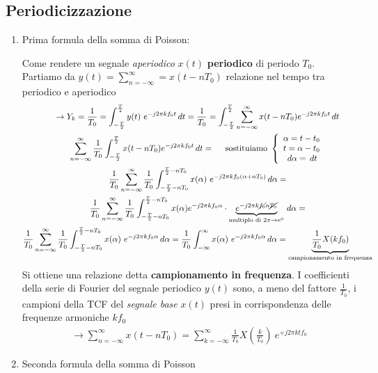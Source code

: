 \documentclass[
]{article}
\begin{document}
\subsection{Periodicizzazione}\label{periodicizzazione}

\begin{enumerate}
\def\labelenumi{\arabic{enumi}.}
\setcounter{enumi}{23}
\item
  Prima formula della somma di Poisson:

  Come rendere un segnale \emph{aperiodico} \(x(t)\) \textbf{periodico}
  di periodo \(T_0\). Partiamo da
  \(y(t)=\sum_{n=-\infty}^{\infty} = x(t-nT_0)\) relazione nel tempo tra
  periodico e aperiodico \begin{gather*}
  \to Y_k = \frac{1}{T_0} = \int_{-\frac{T}{2}}^{\frac{T}{2}} y(t) \ e^{-j2 \pi kf_{0}t} \,dt = \frac{1}{T_0} = \int_{-\frac{T}{2}}^{\frac{T}{2}} \sum_{n=-\infty}^{\infty} x(t-nT_0) e^{-j2\pi kf_{0}t} \,dt \\
  \sum_{n=-\infty}^{\infty}\frac{1}{T_0} \int_{-\frac{T}{2}}^{\frac{T}{2}} x(t-nT_0)e^{-j2\pi kf_{0}t} \,dt = \ \ \ \text{ sostituiamo } \left\{ \begin{array}{cl} \alpha = t-t_0 \\ t = \alpha -t_0 \\ \,d\alpha = \,dt \end{array}\right.  \\
  \frac{1}{T_0} \sum_{n=-\infty}^{\infty}\frac{1}{T_0} \int_{-\frac{T}{2}-nT_0}^{\frac{T}{2}-nT_0} x(\alpha) \ e^{-j2\pi kf_{0}(\alpha +nT_0)} \,d\alpha = \\
  \frac{1}{T_0} \sum_{n=-\infty}^{\infty}\frac{1}{T_0} \int_{-\frac{T}{2}-nT_0}^{\frac{T}{2}-nT_0} x(\alpha) e^{-j2\pi kf_{0}\alpha} \cdot \underbrace{e^{-j2\pi k\cancel{f_0}n\cancel{T_0}}}_{\text{multiplo di }2\pi \to e^{0}} \,d\alpha= \\
  \frac{1}{T_0} \sum_{n=-\infty}^{\infty}\frac{1}{T_0} \int_{-\frac{T}{2}-nT_0}^{\frac{T}{2}-nT_0} x(\alpha) \ e^{-j2\pi kf_{0}\alpha} \,d\alpha =
  \frac{1}{T_0} \int_{-\infty}^{\infty}x(\alpha) \ e^{-j2\pi kf_{0}\alpha}\,d\alpha = \underbrace{\frac{1}{T_0}X(kf_0)}_{\text{campionamento in frequenza}}
  \end{gather*} Si ottiene una relazione detta \textbf{campionamento in
  frequenza}. I coefficienti della serie di Fourier del segnale
  periodico \(y(t)\) sono, a meno del fattore \(\frac{1}{T_0}\), i
  campioni della TCF del \emph{segnale base} \(x(t)\) presi in
  corrispondenza delle frequenze armoniche \(kf_0\) \begin{gather*}
  \to \sum_{n=-\infty}^{\infty}x(t-nT_0) = \sum_{k=-\infty}^{\infty} \frac{1}{T_0} X(\frac{k}{T_0})\ e^{+j2\pi kt f_0}
  \end{gather*}
\item
  Seconda formula della somma di Poisson


\end{enumerate}
\end{document}
